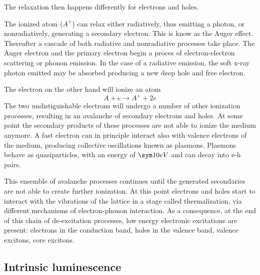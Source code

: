 The relaxation then happens differently for electrons and holes. 

The ionized atom ($A^{+}$) can relax either radiatively, thus emitting a photon, or nonradiatively, generating a secondary electron. This is know as the Auger effect. Thereafter a cascade of both radiative and nonradiative processes take place.
The Auger electron and the primary electron begin a proces of electron-electron scattering or phonon emission. In the case of a radiative emission, the soft x-ray photon emitted may be absorbed producing a new deep hole and free electron. 

The electron on the other hand will ionize an atom
\begin{equation}
A + e \rightarrow A^{+} + 2e
\end{equation}
The two undistiguishable electrons will undergo a number of other ionization processes, resulting in an avalanche of secondary electrons and holes. At some point the secondary products of these processes are not able to ionize the medium anymore.
A fast electron can in principle interact also with valence electrons of the medium, producing collective oscillations known as plasmons. Plasmons behave as quasiparticles, with an energy of $\sym 10 eV$ and can decay into e-h pairs.

This ensemble of avalanche processes continues until the generated secondaries are not able to create further ionization. At this point electrons and holes start to interact with the vibrations of the lattice in a stage called thermalization, via different mechanisms of electron-phonon interaction. 
 As a consequence, at the end of this chain of de-excitation processes, low energy electronic excitations are present: electrons in the conduction band, holes in the valence band, valence excitons, core excitons.
 
\subsection{Intrinsic luminescence}

